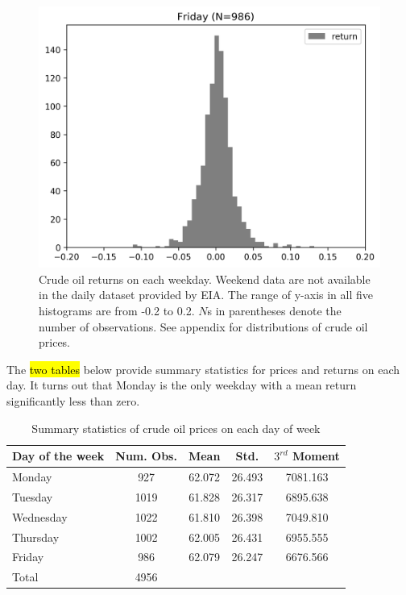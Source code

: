 \documentclass[12pt]{article}
\begin{document}
\begin{figure}[H]
		\includegraphics[width=0.45\linewidth]{figures/day_of_week_effect/dist_returns_Friday.png}
		\caption{Crude oil returns on each weekday. Weekend data are not available in the daily dataset provided by EIA. The range of y-axis in all five histograms are from -0.2 to 0.2. $N$s in parentheses denote the number of observations. See appendix for distributions of crude oil prices.}
	\end{figure}

	\par The \hl{two tables} below provide summary statistics for prices and returns on each day. It turns out that Monday is the only weekday with a mean return significantly less than zero.
	\begin{table}[H]
		\small
		\centering
		\begin{tabular}{l|c c c c}
			\toprule
			Day of the week & Num. Obs. & Mean & Std. & $3^{rd}$ Moment \\
			\midrule
			Monday & 927 & 62.072 & 26.493 & 7081.163 \\
			Tuesday & 1019 & 61.828 & 26.317 & 6895.638 \\
			Wednesday & 1022 & 61.810 & 26.398 & 7049.810 \\
			Thursday & 1002 & 62.005 & 26.431 & 6955.555 \\
			Friday & 986 & 62.079 & 26.247 & 6676.566 \\
			\midrule
			Total & 4956 & & & \\
			\bottomrule
		\end{tabular}
		\caption{Summary statistics of crude oil prices on each day of week}
	\end{table}
\end{document}
